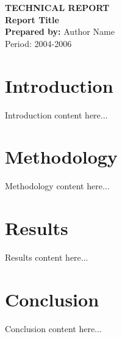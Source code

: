 \documentclass[12pt,a4paper]{report}
\begin{document}
\begin{titlepage}
    \centering
    {\Large\textbf{TECHNICAL REPORT}}\\[2cm]
    {\Huge\textbf{Report Title}}\\[3cm]
    \textbf{Prepared by:} Author Name\\[0.5cm]
    {\large Period: 2004-2006}
\end{titlepage}

\tableofcontents
\newpage

\chapter{Introduction}
Introduction content here...

\chapter{Methodology}
Methodology content here...

\chapter{Results}
Results content here...

\chapter{Conclusion}
Conclusion content here...
\end{document}
